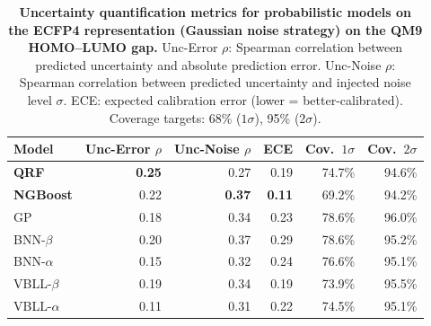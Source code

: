 
\begin{table}[H]
\centering
\caption{\textbf{\SuppFile{} Uncertainty quantification metrics for probabilistic models on the ECFP4 representation (Gaussian noise strategy) on the QM9 HOMO--LUMO gap.}
Unc-Error $\rho$: Spearman correlation between predicted uncertainty and absolute prediction error. Unc-Noise $\rho$: Spearman correlation between predicted uncertainty and injected noise level $\sigma$. ECE: expected calibration error (lower = better-calibrated). Coverage targets: 68\% ($1\sigma$), 95\% ($2\sigma$).}
\label{supp:uncertainty_metrics_ecfp4}
\small
\begin{tabular}{lrrrrr}
\toprule
\textbf{Model} & \textbf{Unc-Error $\rho$} & \textbf{Unc-Noise $\rho$} & \textbf{ECE} & \textbf{Cov.\ $1\sigma$} & \textbf{Cov.\ $2\sigma$} \\
\midrule
\textbf{QRF}     & \textbf{0.25} & 0.27 & 0.19 & 74.7\% & 94.6\% \\
\textbf{NGBoost} & 0.22 & \textbf{0.37} & \textbf{0.11} & 69.2\% & 94.2\% \\
GP               & 0.18 & 0.34 & 0.23 & 78.6\% & 96.0\% \\
BNN-$\beta$      & 0.20 & 0.37 & 0.29 & 78.6\% & 95.2\% \\
BNN-$\alpha$     & 0.15 & 0.32 & 0.24 & 76.6\% & 95.1\% \\
VBLL-$\beta$     & 0.19 & 0.34 & 0.19 & 73.9\% & 95.5\% \\
VBLL-$\alpha$    & 0.11 & 0.31 & 0.22 & 74.5\% & 95.1\% \\
\bottomrule
\end{tabular}
\end{table}
